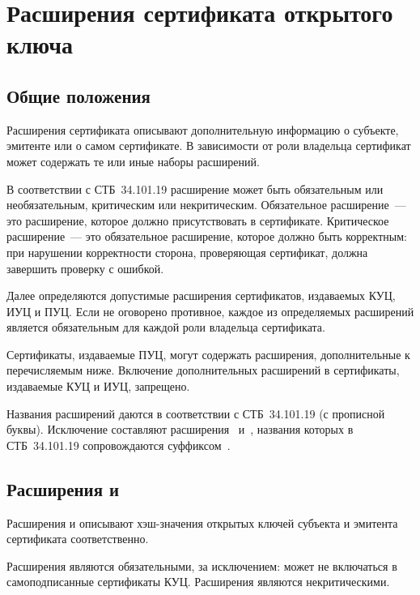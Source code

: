 \section{Расширения сертификата открытого ключа}\label{FMT.Ext}

\subsection{Общие положения}\label{FMT.Ext.Intro} 

Расширения сертификата описывают дополнительную информацию о субъекте, эмитенте
или о самом сертификате. В зависимости от роли владельца сертификат может
содержать те или иные наборы расширений.

В соответствии с СТБ~34.101.19 расширение может быть обязательным или
необязательным, критическим или некритическим. Обязательное расширение~--- это
расширение, которое должно присутствовать в сертификате.  Критическое
расширение~--- это обязательное  расширение, которое должно быть корректным: при
нарушении корректности сторона, проверяющая сертификат, должна завершить
проверку с ошибкой.

Далее определяются допустимые расширения сертификатов, издаваемых КУЦ,
ИУЦ и ПУЦ. Если не оговорено противное, каждое из определяемых
расширений является обязательным для каждой роли владельца сертификата.

Сертификаты, издаваемые ПУЦ, могут содержать расширения, дополнительные к
перечисляемым ниже. Включение дополнительных расширений в сертификаты,
издаваемые КУЦ и ИУЦ, запрещено.

Названия расширений даются в соответствии с СТБ~34.101.19 (с прописной буквы).
Исключение составляют расширения~
и~, названия которых в СТБ~34.101.19 сопровождаются
суффиксом~.

\subsection{Расширения  и
}\label{FMT.Ext.SKID}

Расширения  и  описывают
хэш-значения открытых ключей субъекта и эмитента сертификата соответственно.

Расширения являются обязательными, за исключением: 
может не включаться в самоподписанные сертификаты КУЦ. Расширения являются 
некритическими.

